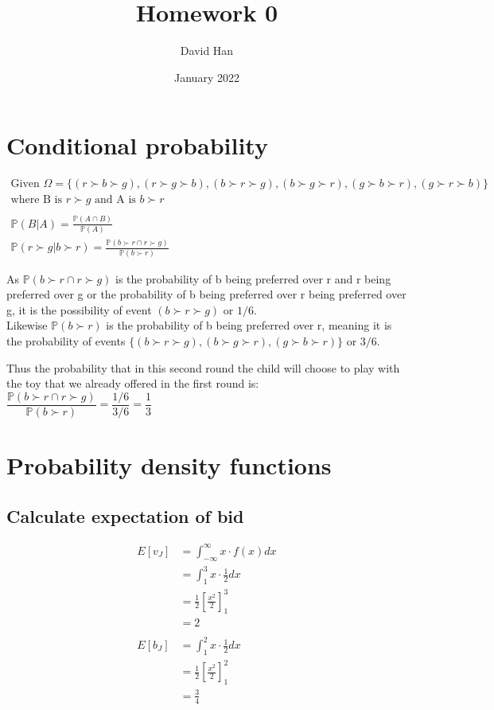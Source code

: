 \documentclass[12pt]{article}
\title{Homework 0}
\author{David Han}
\date{January 2022}
\newcommand{\bbP}{\mathbb{P}}
\renewcommand{\_}[1]{\underline{ #1 }}
\theoremstyle{definition}
\numberwithin{equation}{subsection}
\begin{document}
\maketitle

\section{Conditional probability}
\begin{gather*}
\text{Given $\Omega = \{(r \succ b \succ g), (r \succ g \succ b), (b \succ r \succ g), (b \succ g \succ r), (g \succ b \succ r), (g \succ r \succ b)\}$} \\
\text{where B is $r \succ g$ and A is $b \succ r$} \\ \\
\bbP(B|A)=\frac{\bbP(A\cap B)}{\bbP(A)} \\
\bbP(r \succ g | b \succ r)=\frac{\bbP(b \succ r \cap r \succ g)}{\bbP(b \succ r)}
\end{gather*}

As $\bbP(b \succ r \cap r \succ g)$ is the probability of b being preferred over r and r being preferred over g or the probability of b being preferred over r being preferred over g, it is the possibility of event $(b \succ r \succ g)$ or $1/6$. \\

Likewise $\bbP(b \succ r)$ is the probability of b being preferred over r, meaning it is the probability of events $\{(b \succ r \succ g), (b \succ g \succ r), (g \succ b \succ r)\}$ or $3/6$. \\

\begin{center}
Thus the probability that in this second round the child will choose to play with the toy that we already offered in the first round is: \\
$\dfrac{\bbP(b \succ r \cap r \succ g)}{\bbP(b \succ r)}=\dfrac{1/6}{3/6}=\dfrac{1}{3}$
\end{center}

\section{Probability density functions}
\subsection{Calculate expectation of bid}
\begin{align*}
E[v_J]&=\int_{-\infty}^{\infty}x\cdot f(x)dx \\
&=\int_{1}^{3}x\cdot \frac{1}{2}dx \\
&=\frac{1}{2} \left[ \frac{x^2}{2} \right]_{1}^{3} \\
&=2 \\ \\
E[b_J]&=\int_{1}^{2}x\cdot \frac{1}{2}dx \\
&=\frac{1}{2} \left[ \frac{x^2}{2} \right]_{1}^{2} \\
&=\frac{3}{4}
\end{align*}
\end{document}

